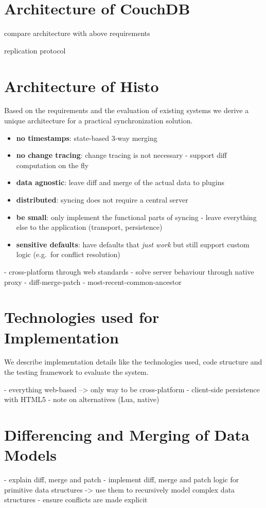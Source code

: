 \section{Architecture of CouchDB}

compare architecture with above requirements

replication protocol

\section{Architecture of Histo}
Based on the requirements and the evaluation of existing systems we derive a unique architecture for a practical synchronization solution.

\begin{itemize}
\item
  \textbf{no timestamps}: state-based 3-way merging
\item
  \textbf{no change tracing}: change tracing is not necessary - support
  diff computation on the fly
\item
  \textbf{data agnostic}: leave diff and merge of the actual data to
  plugins
\item
  \textbf{distributed}: syncing does not require a central server
\item
  \textbf{be small}: only implement the functional parts of syncing -
  leave everything else to the application (transport, persistence)
\item
  \textbf{sensitive defaults}: have defaults that \emph{just work} but
  still support custom logic (e.g.~for conflict resolution)
\end{itemize}

- cross-platform through web standards
- solve server behaviour through native proxy
- diff-merge-patch
- most-recent-common-ancestor

\section{Technologies used for Implementation}
We describe implementation details like the technologies used, code structure and the testing framework to evaluate the system.

- everything web-based --> only way to be cross-platform
- client-side persistence with HTML5
- note on alternatives (Lua, native)

\section{Differencing and Merging of Data Models}
- explain diff, merge and patch
- implement diff, merge and patch logic for primitive data structures
  -> use them to recursively model complex data structures
- ensure conflicts are made explicit

